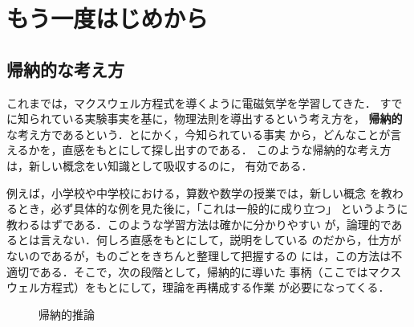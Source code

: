 ﻿%
    \section{もう一度はじめから}
        \subsection{帰納的な考え方}
        これまでは，マクスウェル方程式を導くように電磁気学を学習してきた．
        すでに知られている実験事実を基に，物理法則を導出するという考え方を，
        \textbf{帰納的} な考え方であるという．とにかく，今知られている事実
        から，どんなことが言えるかを，直感をもとにして探し出すのである．
        このような帰納的な考え方は，新しい概念をい知識として吸収するのに，
        有効である．

        例えば，小学校や中学校における，算数や数学の授業では，新しい概念
        を教わるとき，必ず具体的な例を見た後に，「これは一般的に成り立つ」
        というように教わるはずである．このような学習方法は確かに分かりやすい
        が，論理的であるとは言えない．何しろ直感をもとにして，説明をしている
        のだから，仕方がないのであるが，ものごとをきちんと整理して把握するの
        には，この方法は不適切である．そこで，次の段階として，帰納的に導いた
        事柄（ここではマクスウェル方程式）をもとにして，理論を再構成する作業
        が必要になってくる．
            \begin{figure}[hbt]
                \begin{center}
                    \caption{帰納的推論}
                    \label{fig:KinouTekiSuiron}
                \end{center}
            \end{figure}



